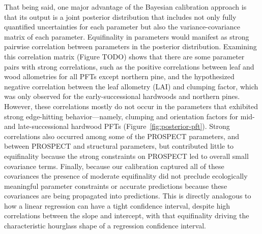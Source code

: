 That being said, one major advantage of the Bayesian calibration approach is that its output is a joint posterior distribution that includes not only fully quantified uncertainties for each parameter but also the variance-covariance matrix of each parameter.
Equifinality in parameters would manifest as strong pairwise correlation between parameters in the posterior distribution.
Examining this correlation matrix (Figure TODO) shows that there are some parameter pairs with strong correlations, such as the positive correlations between leaf and wood allometries for all PFTs except northern pine, and the hypothesized negative correlation between the leaf allometry (LAI) and clumping factor, which was only observed for the early-successional hardwoods and northern pines.
However, these correlations mostly do not occur in the parameters that exhibited strong edge-hitting behavior---namely, clumping and orientation factors for mid- and late-successional hardwood PFTs (Figure~\ref{fig:posterior-pft}).
Strong correlations also occurred among some of the PROSPECT parameters, and between PROSPECT and structural parameters, but contributed little to equifinality because the strong constraints on PROSPECT led to overall small covariance terms.
Finally, because our calibration captured all of these covariances the presence of moderate equifinality did not preclude ecologically meaningful parameter constraints or accurate predictions because these covariances are being propagated into predictions.
This is directly analogous to how a linear regression can have a tight confidence interval, despite high correlations between the slope and intercept, with that equifinality driving the characteristic hourglass shape of a regression confidence interval.

